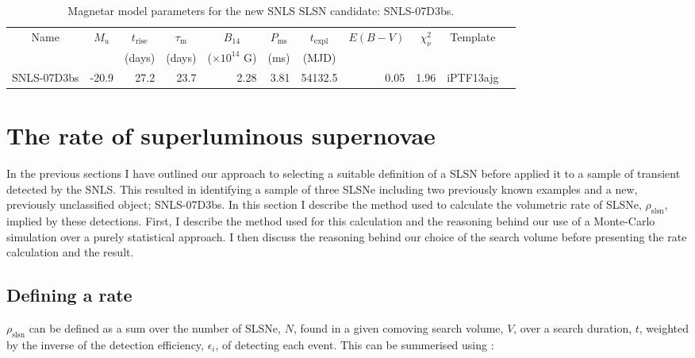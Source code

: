\begin{table}
\begin{center}
\caption{Magnetar model parameters for the new SNLS SLSN candidate: SNLS-07D3bs.}
\label{tab:07d3bsParams}
\begin{tabular}{|l|r|r|r|r|r|r|r|r|r|r|}
\hline
  \multicolumn{1}{|c|}{Name} &
  \multicolumn{1}{c|}{$M_u$} &
  \multicolumn{1}{c|}{$t_\mathrm{rise}$} &
  \multicolumn{1}{c|}{$\tau_\mathrm{m}$} &
  \multicolumn{1}{c|}{$B_{14}$} &
  \multicolumn{1}{c|}{$P_{\mathrm{ms}}$} &
  \multicolumn{1}{c|}{$t_\mathrm{expl}$} &
  \multicolumn{1}{c|}{$E(B-V)$} &
  \multicolumn{1}{c|}{$\chi^2_{\nu}$} &
  \multicolumn{1}{c|}{Template} \\ & &
  \multicolumn{1}{c|}{(days)} &
  \multicolumn{1}{c|}{(days)} &
  \multicolumn{1}{c|}{($\times10^{14}$ G)} &
  \multicolumn{1}{c|}{(ms)} &
  \multicolumn{1}{c|}{(MJD)} & \\
\hline
SNLS-07D3bs & -20.9 &  27.2 & 23.7 & 2.28 & 3.81 & 54132.5 & 0.05 & 1.96 & iPTF13ajg\\
\hline
\end{tabular}
\end{center}
\end{table}

\section{The rate of superluminous supernovae}
\label{sec:MC}
In the previous sections I have outlined our approach to selecting a suitable definition of a SLSN before applied it to a sample of transient detected by the SNLS. This resulted in identifying a sample of three SLSNe including two previously known examples and a new, previously unclassified object; SNLS-07D3bs. In this section I describe the method used to calculate the volumetric rate of SLSNe, $\rho_{\mathrm{slsn}}$, implied by these detections. First, I describe the method used for this calculation and the reasoning behind our use of a Monte-Carlo simulation over a purely statistical approach. I then discuss the reasoning behind our choice of the search volume before presenting the rate calculation and the result.

\subsection{Defining a rate}
\label{sec:method}
$\rho_{\mathrm{slsn}}$ can be defined as a sum over the number of SLSNe, $N$, found in a given comoving search volume, $V$, over a search duration, $t$, weighted by the inverse of the detection efficiency, $\epsilon_{i}$, of detecting each event. This can be summerised using :

